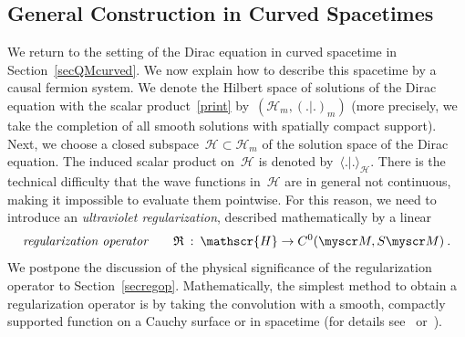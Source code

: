 \documentclass[reqno,11pt]{amsart}
\numberwithin{equation}{section}
\newcommand{\la}{\langle}
\newcommand{\ra}{\rangle}
\newcommand{\1}{\mbox{\rm 1 \hspace{-1.05 em} 1}}
\renewcommand{\H}{\mathscr{H}}
\newcommand{\scrM}{\myscr M}
\begin{document}
\subsection{General Construction in Curved Spacetimes} \label{seccurv}
We return to the setting of the Dirac equation in curved spacetime in Section~\ref{secQMcurved}.
We now explain how to describe this spacetime by a causal fermion system.
We denote the Hilbert space of solutions of the Dirac equation with the scalar product~\eqref{print}
by~$(\H_m, (.|.)_m)$ (more precisely, we take the completion of all smooth solutions with
spatially compact support). 
Next, we choose a closed subspace~$\H \subset \H_m$
of the solution space of the Dirac equation.
The induced scalar product on~$\H$ is denoted by~$\la .|. \ra_\H$.
There is the technical difficulty that the wave functions in~$\H$ are in general not continuous,
making it impossible to evaluate them pointwise.
For this reason, we need to introduce an {\em{ultraviolet regularization}}, described mathematically by a linear
\[ \text{\em{regularization operator}} \qquad {\mathfrak{R}} \::\: \H \rightarrow C^0(\scrM, S\scrM) \:. \]
We postpone the discussion of the physical significance of the regularization operator to
Section~\ref{secregop}. Mathematically, the simplest method to obtain
a regularization operator is by taking the convolution with a smooth, compactly supported function
on a Cauchy surface or in spacetime (for details see~\cite[Section~4]{finite}
or~\cite[Section~\S1.1.2]{cfs}).
\end{document}
